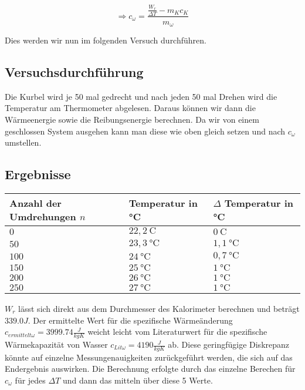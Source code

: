 		$$ \Rightarrow c_{\omega} = \frac{\frac{W_{r}}{\Delta T} - m_{K}c_{K}}{m_{\omega}}$$		
		
		Dies werden wir nun im folgenden Versuch durchführen.
		
	    \subsection{Versuchsdurchführung}
		
       	Die Kurbel wird je 50 mal gedrecht und nach jeden 50 mal Drehen wird die Temperatur am Thermometer abgelesen. Daraus können wir dann die Wärmeenergie sowie die Reibungsenergie berechnen. Da wir von einem geschlossen System ausgehen kann man diese wie oben gleich setzen und nach $c_{\omega}$ umstellen.
  
    \subsection{Ergebnisse}

        \begin{table}[H]
            \centering
            \begin{tabular}{|l|l|l|}
                \hline
                Anzahl der Umdrehungen $n$ & Temperatur in °C & $\Delta$ Temperatur in °C\\
                \hline
                $0$ & $22,2\ \mathrm{C}$ & $0\ \mathrm{C}$\\
                \hline
                $50$ & $23,3\ \mathrm{°C}$ & $1,1\ \mathrm{°C}$\\
                \hline
                $100$ & $24\ \mathrm{°C}$ & $0,7\ \mathrm{°C}$\\
                \hline
                $150$ & $25\ \mathrm{°C}$ & $1\ \mathrm{°C}$\\
                \hline
                $200$ & $26\ \mathrm{°C}$ & $1\ \mathrm{°C}$\\
                \hline
                $250$ & $27\ \mathrm{°C}$ & $1\ \mathrm{°C}$\\
                \hline
            \end{tabular}
        \end{table}
		$W_{r}$ lässt sich direkt aus dem Durchmesser des Kalorimeter berechnen und beträgt $339.0 J$.
        Der ermittelte Wert für die spezifische Wärmeänderung $c_{ermittelt\omega} = 3999.74 \frac{J}{kgK}$ weicht leicht vom Literaturwert für die spezifische Wärmekapazität von Wasser $c_{Lit\omega} = 4190 \frac{J}{kgK}$ ab. Diese geringfügige Diskrepanz könnte auf einzelne Messungenauigkeiten zurückgeführt werden, die sich auf das Endergebnis auswirken. Die Berechnung erfolgte durch das einzelne Berechen für $c_{\omega}$ für jedes $\Delta T$ und dann das mitteln über diese 5 Werte.
        

